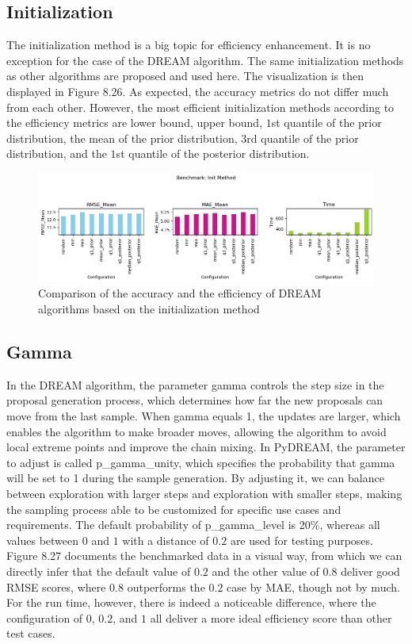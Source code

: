 \subsection{Initialization}
The initialization method is a big topic for efficiency enhancement. It is no exception for the case of the DREAM algorithm. The same initialization methods as other algorithms are proposed and used here. The visualization is then displayed in Figure 8.26. As expected, the accuracy metrics do not differ much from each other. However, the most efficient initialization methods according to the efficiency metrics are lower bound, upper bound, $1$st quantile of the prior distribution, the mean of the prior distribution, $3$rd quantile of the prior distribution, and the $1$st quantile of the posterior distribution.
\begin{figure}[H]
    \centering
    \includegraphics[width=1\textwidth]{figures/dream/init.png}
    \captionsetup{width=.8\textwidth}
    \caption{Comparison of the accuracy and the efficiency of DREAM algorithms based on the initialization method}
    \label{fig:enter-label}
\end{figure}


\subsection{Gamma}
In the DREAM  algorithm, the parameter gamma controls the step size in the proposal generation process, which determines how far the new proposals can move from the last sample. When gamma equals 1, the updates are larger, which enables the algorithm to make broader moves, allowing the algorithm to avoid local extreme points and improve the chain mixing. In PyDREAM, the parameter to adjust is called p\_gamma\_unity, which specifies the probability that gamma will be set to 1 during the sample generation. By adjusting it, we can balance between exploration with larger steps and exploration with smaller steps, making the sampling process able to be customized for specific use cases and requirements. The default probability of p\_gamma\_level is 20\%, whereas all values between $0$ and $1$ with a distance of $0.2$ are used for testing purposes. Figure 8.27 documents the benchmarked data in a visual way, from which we can directly infer that the default value of $0.2$ and the other value of $0.8$ deliver good RMSE scores, where $0.8$ outperforms the $0.2$ case by MAE, though not by much. For the run time, however, there is indeed a noticeable difference, where the configuration of $0$, $0.2$, and $1$ all deliver a more ideal efficiency score than other test cases.

